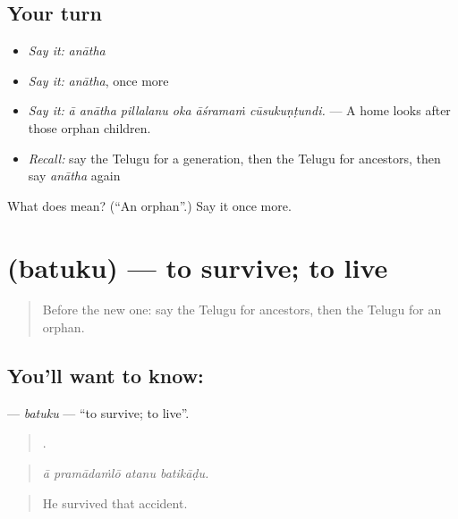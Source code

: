 \subsection*{Your turn}
\begin{itemize}
\raggedright
  \item \emph{Say it:} \emph{anātha}
  \item \emph{Say it:} \emph{anātha}, once more
  \item \emph{Say it:} \emph{ā anātha pillalanu oka āśramaṁ cūsukuṇṭundi.} — A home looks after those orphan children.
  \item \emph{Recall:} say the Telugu for a generation, then the Telugu for ancestors, then say \emph{anātha} again
\end{itemize}

\begin{tcolorbox}[breakable,colback=teal!4,colframe=teal!35!black,title={Before you move on}]
What does  mean? (\textquotedblleft{}An orphan\textquotedblright{}.) Say it once more.
\end{tcolorbox}
\section[\texorpdfstring{\te{బతుకు} (batuku)}{బతుకు (batuku)}]{ (batuku) — to survive; to live}

\label{lesson:TE-C357-batuku}



\begin{quote}
Before the new one: say the Telugu for ancestors, then the Telugu for an orphan.
\end{quote}

\subsection*{You'll want to know: }
\textbf{} — \emph{batuku} — \textquotedblleft{}to survive; to live\textquotedblright{}.

\begin{quote}
   .
\end{quote}

\begin{quote}
\emph{ā pramādaṁlō atanu batikāḍu.}
\end{quote}

\begin{quote}
He survived that accident.
\end{quote}

